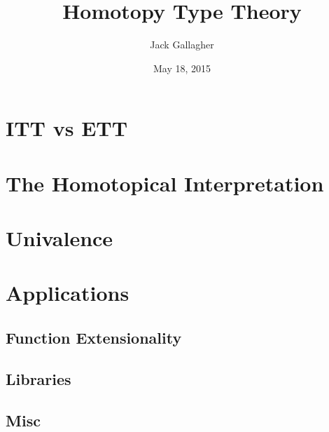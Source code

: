 \documentclass[xcolor=svgnames]{beamer}
\title
  [Homotopy Type Theory\hspace{2em}]
  {Homotopy Type Theory}
\author
  [Jack Gallagher]
  {Jack Gallagher}
\date{May 18, 2015}
\begin{document}
\maketitle

\section{ITT vs ETT}

\section{The Homotopical Interpretation}

\section{Univalence}

\section{Applications}

\subsection{Function Extensionality}
\subsection{Libraries}
\subsection{Misc}
\end{document}

